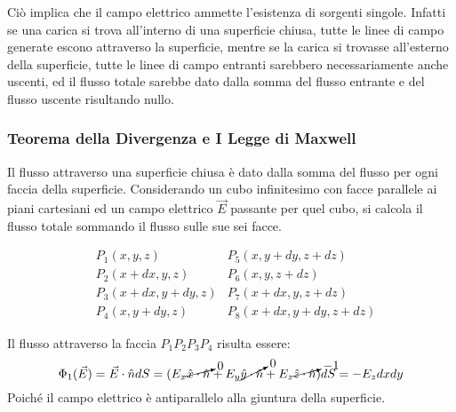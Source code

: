 \documentclass{article}
\numberwithin{equation}{subsection}
\begin{document}
Ciò implica che il campo elettrico ammette l'esistenza di sorgenti singole. Infatti se una carica si trova all'interno di una superficie chiusa, tutte le linee di campo generate 
escono attraverso la superficie, mentre se la carica si trovasse all'esterno della superficie, tutte le linee di campo entranti sarebbero necessariamente anche uscenti, ed il 
flusso totale sarebbe dato dalla somma del flusso entrante e del flusso uscente risultando nullo. 

\subsubsection{Teorema della Divergenza e I Legge di Maxwell}

Il flusso attraverso una superficie chiusa è dato dalla somma del flusso per ogni faccia della superficie. Considerando un cubo infinitesimo con facce parallele ai piani 
cartesiani ed un campo elettrico $\vec{E}$ passante per quel cubo, si calcola il flusso totale sommando il flusso sulle sue sei facce. 
\begin{center}
\end{center}
\begin{align*}
    &P_1(x,y,z) &P_5(x,y+dy,z+dz)\\
    &P_2(x+dx,y,z) &P_6(x,y,z+dz)\\
    &P_3(x+dx,y+dy,z) &P_7(x+dx,y,z+dz)\\
    &P_4(x,y+dy,z) &P_8(x+dx,y+dy,z+dz)
\end{align*}

Il flusso attraverso la faccia $P_1P_2P_3P_4$ risulta essere:
\begin{equation*}
    \Phi_1(\vec{E})=\vec{E}\cdot\hat{n}dS=(E_x\cancelto{0}{\hat{x}\cdot\hat{n}}+E_y\cancelto{0}{\hat{y}\cdot\hat{n}}+E_z\cancelto{-1}{\hat{z}\cdot\hat{n}})dS=-E_zdxdy
\end{equation*}
Poiché il campo elettrico è antiparallelo alla giuntura della superficie. 
\end{document}
